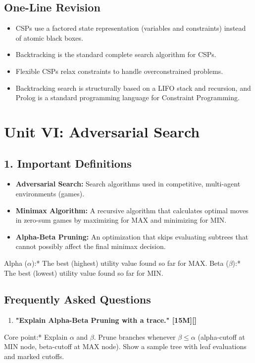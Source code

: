 \subsection{One-Line Revision}
\begin{itemize}
  \item   CSPs use a factored state representation (variables and constraints) instead of atomic black boxes.
  \item   Backtracking is the standard complete search algorithm for CSPs.
  \item   Flexible CSPs relax constraints to handle overconstrained problems.
  \item   Backtracking search is structurally based on a LIFO stack and recursion, and Prolog is a standard programming language for Constraint Programming.
\end{itemize}



\section{Unit VI: Adversarial Search}

\subsection{1. Important Definitions}
\begin{itemize}
  \item   \textbf{Adversarial Search:} Search algorithms used in competitive, multi-agent environments (games).
  \item   \textbf{Minimax Algorithm:} A recursive algorithm that calculates optimal moves in zero-sum games by maximizing for MAX and minimizing for MIN.
  \item   \textbf{Alpha-Beta Pruning:} An optimization that skips evaluating subtrees that cannot possibly affect the final minimax decision.
\end{itemize}
    \textit{   }Alpha ($\alpha$):* The best (highest) utility value found so far for MAX.
    \textit{   }Beta ($\beta$):* The best (lowest) utility value found so far for MIN.

\subsection{Frequently Asked Questions}
\begin{enumerate}
  \item \textbf{"Explain Alpha-Beta Pruning with a trace." [15M][]}
\end{enumerate}
    \textit{   }Core point:* Explain $\alpha$ and $\beta$. Prune branches whenever $\beta \le \alpha$ (alpha-cutoff at MIN node, beta-cutoff at MAX node). Show a sample tree with leaf evaluations and marked cutoffs.

